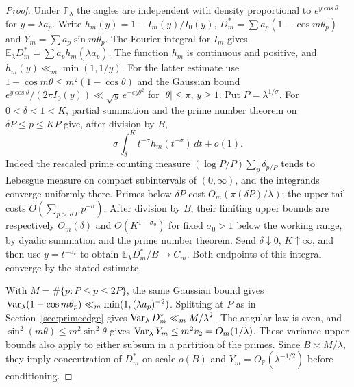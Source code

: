 \documentclass[11pt]{article}
\begin{document}
\begin{proof}
Under $\mathbb P_\lambda$ the angles are independent with density
proportional to $e^{y\cos\theta}$ for $y=\lambda a_p$.
Write $h_m(y)=1-I_m(y)/I_0(y)$,
$D_m^*=\sum a_p(1-\cos m\theta_p)$ and $Y_m=\sum a_p\sin m\theta_p$.
The Fourier integral for $I_m$ gives
$\mathbb E_\lambda D_m^*=\sum a_ph_m(\lambda a_p)$.
The function $h_m$ is continuous and positive, and
$h_m(y)\ll_m\min(1,1/y)$. For the latter estimate use
$1-\cos m\theta\le m^2(1-\cos\theta)$ and the Gaussian bound
$e^{y\cos\theta}/(2\pi I_0(y))\ll\sqrt y\,e^{-cy\theta^2}$
for $|\theta|\le\pi$, $y\ge1$.
Put $P=\lambda^{1/\sigma}$. For $0<\delta<1<K$, partial summation
and the prime number theorem on $\delta P\le p\le KP$ give, after
division by $B$,
\[
 \sigma\int_\delta^K t^{-\sigma}h_m(t^{-\sigma})\,dt+o(1).
\]
Indeed the rescaled prime counting measure
$(\log P/P)\sum_p\delta_{p/P}$ tends to Lebesgue measure on compact
subintervals of $(0,\infty)$, and the integrands converge uniformly
there. Primes below $\delta P$ cost $O_m(\pi(\delta P)/\lambda)$;
the upper tail costs $O(\sum_{p>KP}p^{-\sigma})$.
After division by $B$, their limiting upper bounds are respectively
$O_m(\delta)$ and $O(K^{1-\sigma_0})$ for fixed $\sigma_0>1$
below the working range, by dyadic summation and the prime number
theorem. Send $\delta\downarrow0$, $K\uparrow\infty$, and then use
$y=t^{-\sigma_e}$ to obtain $\mathbb E_\lambda D_m^*/B\to C_m$.
Both endpoints of this integral converge by the stated estimate.

With $M=\#\{p:P\le p\le2P\}$, the same Gaussian bound gives
$\mathop{\rm Var}_\lambda(1-\cos m\theta_p)
\ll_m \min(1,(\lambda a_p)^{-2})$.
Splitting at $P$ as in Section~\ref{sec:primeedge} gives
$\mathop{\rm Var}_\lambda D_m^*\ll_m M/\lambda^2$.
The angular law is even, and
$\sin^2(m\theta)\le m^2\sin^2\theta$ gives
$\mathop{\rm Var}_\lambda Y_m\le m^2v_2=O_m(1/\lambda)$.
These variance upper bounds also apply to either subsum in a partition
of the primes. Since $B\asymp M/\lambda$, they imply concentration
of $D_m^*$ on scale $o(B)$ and $Y_m=O_{\mathbb P}(\lambda^{-1/2})$
before conditioning.


\end{proof}
\end{document}
